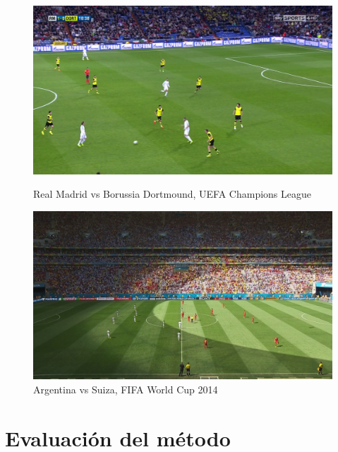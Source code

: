 \begin{figure}[H]
    \centering
    \captionsetup{justification=centering}
    \begin{minipage}[t]{.45\textwidth}
        \centering
        \includegraphics[width=\linewidth]{./images/realmadrid1.png}
        \caption{Real Madrid vs Borussia Dortmound, UEFA Champions League
        \label{fig:realmadrid}}
    \end{minipage}%
    \vspace{0.1cm}
    \begin{minipage}[t]{.45\textwidth}
        \centering
        \includegraphics[width=\linewidth]{./images/argentina1.png}
        \caption{Argentina vs Suiza, FIFA World Cup 2014
        \label{fig:argentina1}}
    \end{minipage}
\end{figure}

\section{Evaluación del método}
\label{sec:evaluacion}

